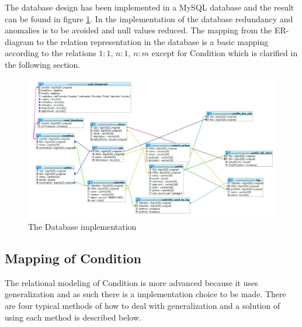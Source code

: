 The database design has been implemented in a MySQL database and the result can be found in figure \ref{fig:databaseDiagram}. In the implementation of the database redundancy and anomalies is to be avoided and null values reduced. 
The mapping from the ER-diagram to the relation representation in the database is a basic mapping according to the relations $1:1$, $n:1$, $n:m$ except for Condition which is clarified in the following section. \citep{DatabaseKilde}

\begin{figure}
	\centering
		\includegraphics[width=1.50\textwidth,  angle=90]{images/databaseDiagram.jpg}
	\caption{The Database implementation}
	\label{fig:databaseDiagram}
\end{figure}

\subsection{Mapping of Condition}
\label{subsec:mappRule}
The relational modeling of Condition is more advanced because it uses generalization and as such there is a implementation choice to be made. There are four typical methods of how to deal with generalization and a solution of using each method is described below.\citep{DatabaseKilde}

